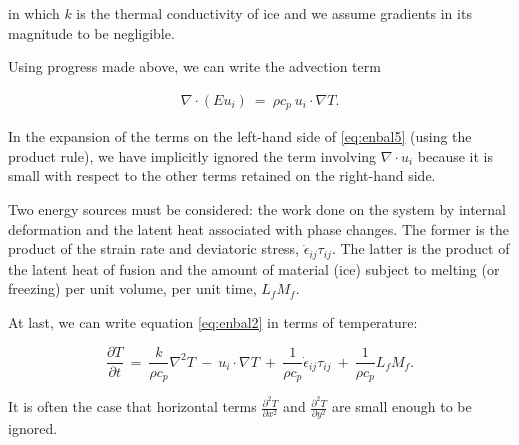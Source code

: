 \noindent
in which $k$ is the thermal conductivity of ice and we assume
gradients in its magnitude to be negligible. 

Using progress made above, we can write the advection term

\begin{equation}
\begin{matrix}
\nabla \cdot \left(E u_{i} \right)~=~\rho c_{p}~ u_{i} \cdot \nabla T. 
\end{matrix}
\label{eq:enbal5}
\end{equation}

\noindent
In the expansion of the terms on the left-hand side of \eqref{eq:enbal5} (using the product rule), we 
have implicitly ignored the term involving $\nabla \cdot u_{i}$ because it is small with respect to the other terms
retained on the right-hand side.

Two energy sources must be considered: the work done on
the system by internal deformation and the latent heat associated with
phase changes. The former is the product of the strain rate and
deviatoric stress, $\dot{\epsilon}_{ij} \tau_{ij}$. The latter is the
product of the latent heat of fusion and the amount of material (ice) subject
to melting (or freezing) per unit volume, per unit time, $L_{f}M_{f}$.

At last, we can write equation \eqref{eq:enbal2} in terms of temperature:

\begin{equation}
\frac{\partial T}{\partial t}~=~\frac{k}{\rho c_{p}} \nabla^{2}T~-~u_{i}\cdot \nabla T~+~\frac{1}{\rho c_{p}} \dot{\epsilon}_{ij} \tau_{ij} ~+~\frac{1}{\rho c_{p}} L_{f} M_{f}.
\label{eq:enbal6}
\end{equation}

\noindent
It is often the case that horizontal terms
$\frac{\partial^{2} T}{\partial x^{2}}$ and
$\frac{\partial^{2} T}{\partial y^{2}}$ are small enough to be ignored.
